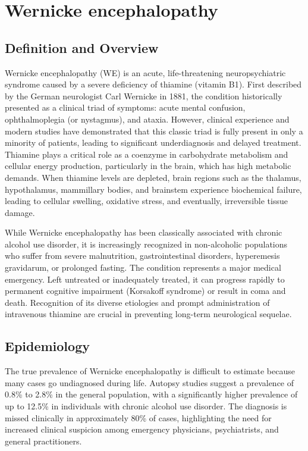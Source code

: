 \chapter{Wernicke encephalopathy}

\section*{Definition and Overview}
Wernicke encephalopathy (WE) is an acute, life-threatening neuropsychiatric syndrome caused by a severe deficiency of thiamine (vitamin B1). First described by the German neurologist Carl Wernicke in 1881, the condition historically presented as a clinical triad of symptoms: acute mental confusion, ophthalmoplegia (or nystagmus), and ataxia. However, clinical experience and modern studies have demonstrated that this classic triad is fully present in only a minority of patients, leading to significant underdiagnosis and delayed treatment. Thiamine plays a critical role as a coenzyme in carbohydrate metabolism and cellular energy production, particularly in the brain, which has high metabolic demands. When thiamine levels are depleted, brain regions such as the thalamus, hypothalamus, mammillary bodies, and brainstem experience biochemical failure, leading to cellular swelling, oxidative stress, and eventually, irreversible tissue damage.

While Wernicke encephalopathy has been classically associated with chronic alcohol use disorder, it is increasingly recognized in non-alcoholic populations who suffer from severe malnutrition, gastrointestinal disorders, hyperemesis gravidarum, or prolonged fasting. The condition represents a major medical emergency. Left untreated or inadequately treated, it can progress rapidly to permanent cognitive impairment (Korsakoff syndrome) or result in coma and death. Recognition of its diverse etiologies and prompt administration of intravenous thiamine are crucial in preventing long-term neurological sequelae.

\section*{Epidemiology}
The true prevalence of Wernicke encephalopathy is difficult to estimate because many cases go undiagnosed during life. Autopsy studies suggest a prevalence of 0.8\% to 2.8\% in the general population, with a significantly higher prevalence of up to 12.5\% in individuals with chronic alcohol use disorder. The diagnosis is missed clinically in approximately 80\% of cases, highlighting the need for increased clinical suspicion among emergency physicians, psychiatrists, and general practitioners.

